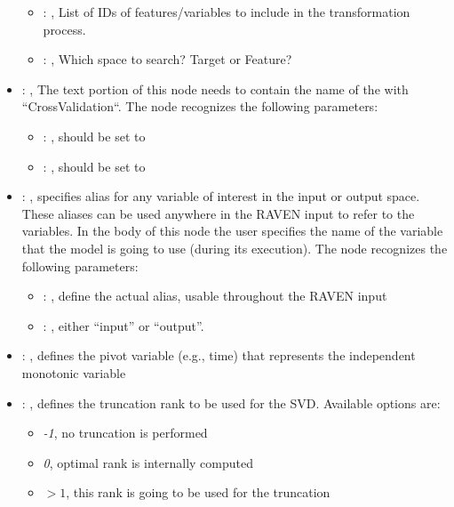 \begin{itemize}
\begin{itemize}
        \item {}: , 
          List of IDs of features/variables to include in the transformation process.

        \item {}: , 
          Which space to search? Target or Feature?
      \end{itemize}

    \item {}: , 
      The text portion of this node needs to contain the name of the  with
               ``CrossValidation``.
      The  node recognizes the following parameters:
        \begin{itemize}
          \item {}: , 
            should be set to 
          \item {}: , 
            should be set to 
      \end{itemize}

    \item {}: , 
      specifies alias for         any variable of interest in the input or output space. These
      aliases can be used anywhere in the RAVEN input to         refer to the variables. In the body
      of this node the user specifies the name of the variable that the model is going to use
      (during its execution).
      The  node recognizes the following parameters:
        \begin{itemize}
          \item {}: , 
            define the actual alias, usable throughout the RAVEN input
          \item {}: , 
            either ``input'' or ``output''.
      \end{itemize}

    \item {}: , 
      defines the pivot variable (e.g., time) that represents the
      independent monotonic variable

    \item {}: , 
      defines the truncation rank to be used for the SVD.
      Available options are:                                                  \begin{itemize}
      \item \textit{-1}, no truncation is performed
      \item \textit{0}, optimal rank is internally computed
      \item \textit{$>1$}, this rank is going to be used for the truncation
      \end{itemize}


\end{itemize}
